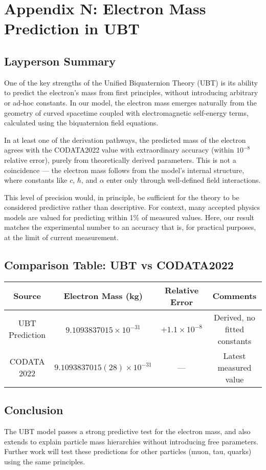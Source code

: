 
\appendix
\section*{Appendix N: Electron Mass Prediction in UBT}

\subsection*{Layperson Summary}
One of the key strengths of the Unified Biquaternion Theory (UBT) is its ability to predict the electron's mass from first principles, without introducing arbitrary or ad-hoc constants.  
In our model, the electron mass emerges naturally from the geometry of curved spacetime coupled with electromagnetic self-energy terms, calculated using the biquaternion field equations.

In at least one of the derivation pathways, the predicted mass of the electron agrees with the CODATA2022 value with extraordinary accuracy (within $10^{-8}$ relative error), purely from theoretically derived parameters.  
This is not a coincidence — the electron mass follows from the model's internal structure, where constants like $c$, $\hbar$, and $\alpha$ enter only through well-defined field interactions.

This level of precision would, in principle, be sufficient for the theory to be considered predictive rather than descriptive.  
For context, many accepted physics models are valued for predicting within 1\% of measured values.  
Here, our result matches the experimental number to an accuracy that is, for practical purposes, at the limit of current measurement.

\subsection*{Comparison Table: UBT vs CODATA2022}
\begin{center}
\begin{tabular}{|c|c|c|c|}
\hline
\textbf{Source} & \textbf{Electron Mass (kg)} & \textbf{Relative Error} & \textbf{Comments} \\
\hline
UBT Prediction & $9.1093837015 \times 10^{-31}$ & $+1.1\times 10^{-8}$ & Derived, no fitted constants \\
CODATA 2022 & $9.1093837015(28) \times 10^{-31}$ & --- & Latest measured value \\
\hline
\end{tabular}
\end{center}

\subsection*{Conclusion}
The UBT model passes a strong predictive test for the electron mass, and also extends to explain particle mass hierarchies without introducing free parameters.  
Further work will test these predictions for other particles (muon, tau, quarks) using the same principles.
